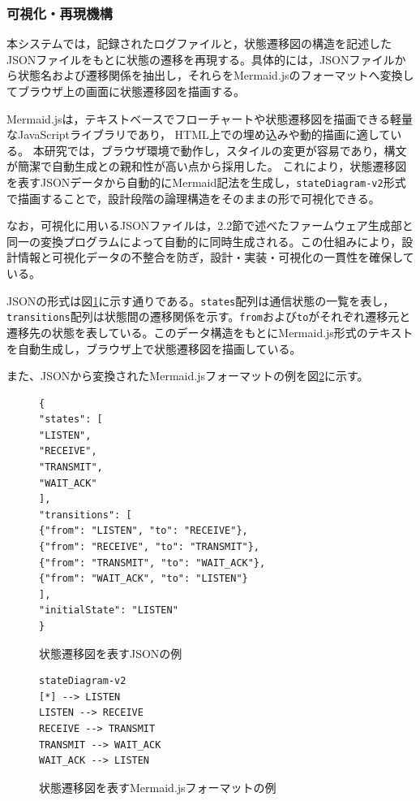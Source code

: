 \documentclass[technicalreport]{ieicej}
\begin{document}
\subsubsection{可視化・再現機構}
本システムでは，記録されたログファイルと，状態遷移図の構造を記述したJSONファイルをもとに状態の遷移を再現する。具体的には，JSONファイルから状態名および遷移関係を抽出し，それらをMermaid.jsのフォーマットへ変換してブラウザ上の画面に状態遷移図を描画する。

Mermaid.jsは，テキストベースでフローチャートや状態遷移図を描画できる軽量なJavaScriptライブラリであり，
HTML上での埋め込みや動的描画に適している\cite{Mermaid}。
本研究では，ブラウザ環境で動作し，スタイルの変更が容易であり，構文が簡潔で自動生成との親和性が高い点から採用した。
これにより，状態遷移図を表すJSONデータから自動的にMermaid記法を生成し，\verb|stateDiagram-v2|形式\cite{MermaidStateDiagram}で描画することで，設計段階の論理構造をそのままの形で可視化できる。


なお，可視化に用いるJSONファイルは，2.2節で述べたファームウェア生成部と同一の変換プログラムによって自動的に同時生成される。この仕組みにより，設計情報と可視化データの不整合を防ぎ，設計・実装・可視化の一貫性を確保している。

JSONの形式は図\ref{fig:json-structure}に示す通りである。\texttt{states}配列は通信状態の一覧を表し，\texttt{transitions}配列は状態間の遷移関係を示す。\texttt{from}および\texttt{to}がそれぞれ遷移元と遷移先の状態を表している。このデータ構造をもとにMermaid.js形式のテキストを自動生成し，ブラウザ上で状態遷移図を描画している。

また、JSONから変換されたMermaid.jsフォーマットの例を図\ref{fig:mermaid-example}に示す。
\begin{figure}[h]
\scriptsize
\centering
\begin{lstlisting}
{
"states": [
"LISTEN",
"RECEIVE",
"TRANSMIT",
"WAIT_ACK"
],
"transitions": [
{"from": "LISTEN", "to": "RECEIVE"},
{"from": "RECEIVE", "to": "TRANSMIT"},
{"from": "TRANSMIT", "to": "WAIT_ACK"},
{"from": "WAIT_ACK", "to": "LISTEN"}
],
"initialState": "LISTEN"
}
\end{lstlisting}
\caption{状態遷移図を表すJSONの例}
\label{fig:json-structure}
\end{figure}



\begin{figure}[h]
\scriptsize
\begin{lstlisting}
stateDiagram-v2
[*] --> LISTEN
LISTEN --> RECEIVE
RECEIVE --> TRANSMIT
TRANSMIT --> WAIT_ACK
WAIT_ACK --> LISTEN
\end{lstlisting}
\caption{状態遷移図を表すMermaid.jsフォーマットの例}
\label{fig:mermaid-example}
\end{figure}
\end{document}
